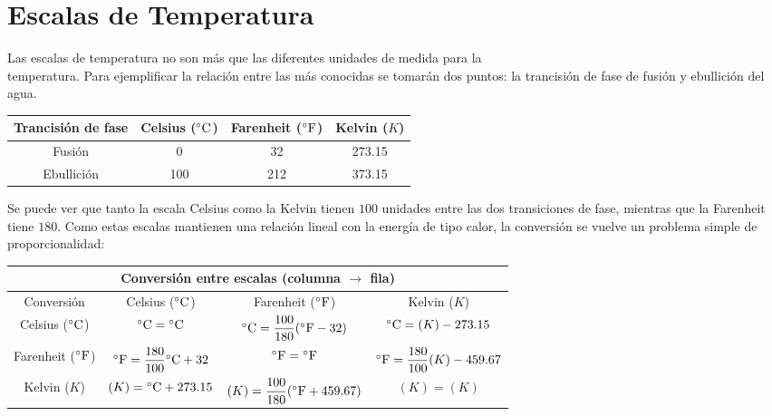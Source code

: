 \section{Escalas de Temperatura}

Las escalas de temperatura no son más que las diferentes unidades de
medida para la \\temperatura. Para ejemplificar la relación entre las más
conocidas se tomarán dos puntos: la trancisión de fase de fusión y
ebullición del agua.
\begin{center}
    \begin{tabular}{c|c|c|c}
        Trancisión de fase  & Celsius ($\degree$)   & 
        Farenheit ($\degree[F]$) & Kelvin ($K$)\\
        \hline
        Fusión              & 0                     & 32    & 273.15\\
        Ebullición          & 100                   & 212   & 373.15
    \end{tabular}
\end{center}

Se puede ver que tanto la escala Celsius como la Kelvin tienen $100$
unidades entre las dos transiciones de fase, mientras que la Farenheit
tiene $180$. Como estas escalas mantienen una relación lineal con la
energía de tipo calor, la conversión se vuelve un problema simple de
proporcionalidad:

\begin{center}
    \renewcommand{\arraystretch}{1.75}
    \begin{tabular}{|c|c|c|c|}
        \hline
        \multicolumn{4}{|c|}{Conversión entre escalas (columna $\to$ fila)}\\
        \hline
        Conversión 
            & Celsius ($\degree$)
            & Farenheit ($\degree[F]$)
            & Kelvin ($K$)\\
        \hline
        Celsius ($\degree$)
            & $\degree=\degree$
            & $\degree = \dfrac{100}{180}(\degree[F]-32)$
            & $\degree = (K) - 273.15$\\
        \hline
        Farenheit ($\degree[F]$)
            & $\degree[F] = \dfrac{180}{100}\degree + 32$
            & $\degree[F] = \degree[F]$
            & $\degree[F] = \dfrac{180}{100}(K)-459.67$\\
        \hline
        Kelvin ($K$)
            & $(K) = \degree + 273.15$
            & $(K) = \dfrac{100}{180}(\degree[F] + 459.67)$
            & $(K) = (K)$\\
        \hline
    \end{tabular}
\end{center}

